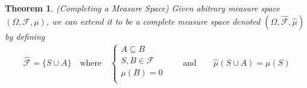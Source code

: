 \documentclass[12pt]{article}
\theoremstyle{plain}
\newtheorem{thm}{Theorem}[section]
\theoremstyle{definition}
\theoremstyle{remark}
\newcommand{\sF}{\mathscr{F}}
\begin{document}
\begin{thm}\emph{(Completing a Measure Space)}
Given abitrary measure space $(\Omega,\sF,\mu)$, we can extend it to be
a \emph{complete} measure space denoted
$(\Omega,\hat{\sF},\hat{\mu})$ by defining
\begin{align*}
  \hat{\sF} = \{S\cup A \}
  \quad \text{where} \quad
  \left\{
      \begin{array}{l}
      A \subseteq B\\
      S, B\in\sF\\
      \mu(B) = 0 \\
  \end{array}
  \right.
  \qquad \text{and} \qquad
  \hat{\mu}(S\cup A) = \mu(S)
\end{align*}
\end{thm}
\end{document}
